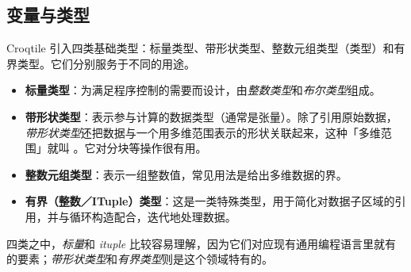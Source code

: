 \subsection*{变量与类型}

Croqtile 引入四类基础类型：标量类型、带形状类型、整数元组类型（\co@ituple@ 类型）和有界类型。它们分别服务于不同的用途。

\begin{itemize}[leftmargin=1.6em]
\item \textbf{标量类型}：为满足程序控制的需要而设计，由\emph{整数类型}和\emph{布尔类型}组成。
\item \textbf{带形状类型}：表示参与计算的数据类型（通常是张量）。除了引用原始数据，\emph{带形状类型}还把数据与一个用多维范围表示的形状关联起来，这种「多维范围」就叫 \co@mdspan@。它对分块等操作很有用。
\item \textbf{整数元组类型}：表示一组整数值，常见用法是给出多维数据的界。
\item \textbf{有界（整数／ITuple）类型}：这是一类特殊类型，用于简化对数据子区域的引用，并与循环构造配合，迭代地处理数据。
\end{itemize}

四类之中，\emph{标量}和 \emph{ituple} 比较容易理解，因为它们对应现有通用编程语言里就有的要素；\emph{带形状类型}和\emph{有界类型}则是这个领域特有的。
